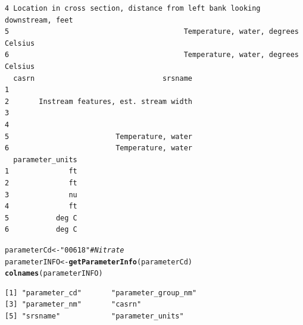 \documentclass[a4paper,11pt]{article}\usepackage[]{graphicx}\usepackage[]{color}
\makeatletter
\newcommand{\hlstr}[1]{\textcolor[rgb]{0.192,0.494,0.8}{#1}}%
\newcommand{\hlcom}[1]{\textcolor[rgb]{0.678,0.584,0.686}{\textit{#1}}}%
\newcommand{\hlstd}[1]{\textcolor[rgb]{0.345,0.345,0.345}{#1}}%
\newcommand{\hlkwb}[1]{\textcolor[rgb]{0.69,0.353,0.396}{#1}}%
\newcommand{\hlkwd}[1]{\textcolor[rgb]{0.737,0.353,0.396}{\textbf{#1}}}%
\newenvironment{kframe}{%
 \def\at@end@of@kframe{}%
 \ifinner\ifhmode%
  \def\at@end@of@kframe{\end{minipage}}%
  \begin{minipage}{\columnwidth}%
 \fi\fi%
 \def\FrameCommand##1{\hskip\@totalleftmargin \hskip-\fboxsep
 \colorbox{shadecolor}{##1}\hskip-\fboxsep
     \hskip-\linewidth \hskip-\@totalleftmargin \hskip\columnwidth}%
 \MakeFramed {\advance\hsize-\width
   \@totalleftmargin\z@ \linewidth\hsize
   \@setminipage}}%
 {\par\unskip\endMakeFramed%
 \at@end@of@kframe}
\newenvironment{knitrout}{}{} %
\makeatother
\begin{document}
\begin{knitrout}
\begin{kframe}
\begin{verbatim}
4 Location in cross section, distance from left bank looking downstream, feet
5                                         Temperature, water, degrees Celsius
6                                         Temperature, water, degrees Celsius
  casrn                              srsname
1                                           
2       Instream features, est. stream width
3                                           
4                                           
5                         Temperature, water
6                         Temperature, water
  parameter_units
1              ft
2              ft
3              nu
4              ft
5           deg C
6           deg C
\end{verbatim}
\begin{alltt}
\hlstd{parameterCd} \hlkwb{<-} \hlstr{"00618"} \hlcom{# Nitrate}
\hlstd{parameterINFO} \hlkwb{<-} \hlkwd{getParameterInfo}\hlstd{(parameterCd)}
\hlkwd{colnames}\hlstd{(parameterINFO)}
\end{alltt}
\begin{verbatim}
[1] "parameter_cd"       "parameter_group_nm"
[3] "parameter_nm"       "casrn"             
[5] "srsname"            "parameter_units"   
\end{verbatim}
\end{kframe}
\end{knitrout}


\newpage
\end{document}
